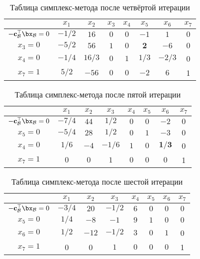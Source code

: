 \documentclass[12pt]{article}
\begin{document}
\begin{table}[!ht]
\centering
\caption{Таблица симплекс-метода после четвёртой итерации}
\begin{tabular}{|c|ccccccc|}
\hline
& $x_1$ & $x_2$ & $x_3$ & $x_4$ & $x_5$ & $x_6$ & $x_7$\\
\hline
$-\mathbf{c}_{\mathcal{B}}^{\top}\bx_{\mathcal{B}} = 0$ & $-1/2$ & $16$ & $0$ & $0$ & $-1$ & $1$ & $0$ \\
\hline
$x_3 = 0$ & $-5/2$ & $56$ & $1$ & $0$ & $\mathbf{2}$ & $-6$ & $0$ \\
$x_4 = 0$ & $-1/4$ & $16/3$ & $0$ & $1$ & $1/3$ & $-2/3$ & 0 \\
$x_7 = 1$ & $5/2$ & $-56$ & $0$ & $0$ & $-2$ & $6$ & 1 \\
\hline
\end{tabular}
\label{tab::simplex_24}
\end{table}

\begin{table}[!ht]
\centering
\caption{Таблица симплекс-метода после пятой итерации}
\begin{tabular}{|c|ccccccc|}
\hline
& $x_1$ & $x_2$ & $x_3$ & $x_4$ & $x_5$ & $x_6$ & $x_7$\\
\hline
$-\mathbf{c}_{\mathcal{B}}^{\top}\bx_{\mathcal{B}} = 0$ & $-7/4$ & $44$ & $1/2$ & $0$ & $0$ & $-2$ & $0$ \\
\hline
$x_5 = 0$ & $-5/4$ & $28$ & $1/2$ & $0$ & $1$ & $-3$ & $0$ \\
$x_4 = 0$ & $1/6$ & $-4$ & $-1/6$ & $1$ & $0$ & $\mathbf{1/3}$ & 0 \\
$x_7 = 1$ & $0$ & $0$ & $1$ & $0$ & $0$ & $0$ & 1 \\
\hline
\end{tabular}
\label{tab::simplex_25}
\end{table}

\begin{table}[!ht]
\centering
\caption{Таблица симплекс-метода после шестой итерации}
\begin{tabular}{|c|ccccccc|}
\hline
& $x_1$ & $x_2$ & $x_3$ & $x_4$ & $x_5$ & $x_6$ & $x_7$\\
\hline
$-\mathbf{c}_{\mathcal{B}}^{\top}\bx_{\mathcal{B}} = 0$ & $-3/4$ & $20$ & $-1/2$ & $6$ & $0$ & $0$ & $0$ \\
\hline
$x_5 = 0$ & $1/4$ & $-8$ & $-1$ & $9$ & $1$ & $0$ & $0$ \\
$x_6 = 0$ & $1/2$ & $-12$ & $-1/2$ & $3$ & $0$ & $1$ & 0 \\
$x_7 = 1$ & 0 & 0 & $1$ & $0$ & $0$ & $0$ & 1 \\
\hline
\end{tabular}
\label{tab::simplex_26}
\end{table}
\end{document}
